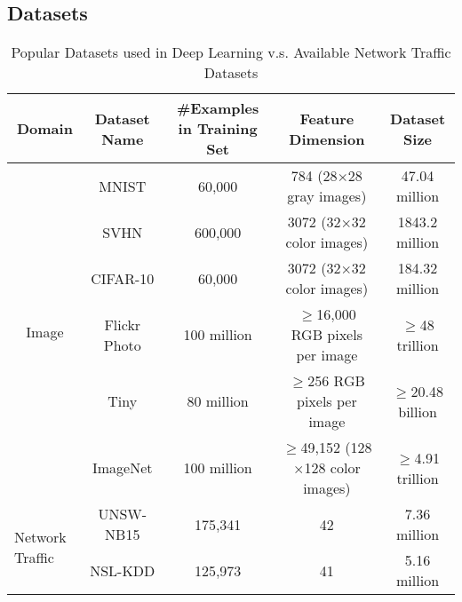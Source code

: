 \subsection{Datasets}

\begin{table*}[]
\centering
\caption{Popular Datasets used in Deep Learning v.s. Available Network Traffic Datasets}
\label{Tab:Datasets}
\begin{tabular}{c|c|c|c|c}
\multicolumn{1}{c|}{Domain}                          & Dataset Name  & \#Examples in Training Set & Feature Dimension                         & Dataset Size \\
\hline
\hline
\multirow{6}{*}{Image}                               & MNIST         & 60,000        & 784 (28$\times$28 gray images)            & 47.04 million \\
                                                     & SVHN          & 600,000       & 3072 (32$\times$32 color images)          & 1843.2 million \\
                                                     & CIFAR-10      & 60,000        & 3072 (32$\times$32 color images)          & 184.32 million \\
                                                     & Flickr Photo  & 100 million   & $\geq$16,000 RGB pixels per image          & $\geq$48 trillion \\
                                                     & Tiny          & 80 million    & $\geq$256 RGB pixels per image             & $\geq$20.48 billion \\
                                                     & ImageNet      & 100 million   & $\geq$49,152 (128$\times$128 color images) & $\geq$4.91 trillion \\
\hline
\multicolumn{1}{l|}{\multirow{2}{*}{Network Traffic}} & UNSW-NB15    & 175,341       & 42                                        & 7.36 million \\
\multicolumn{1}{l|}{}                                 & NSL-KDD      & 125,973       & 41                                        & 5.16 million
\end{tabular}
\end{table*}
